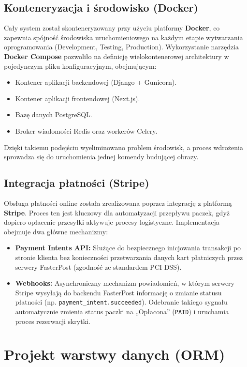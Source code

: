 \subsection{Konteneryzacja i środowisko (Docker)}
Cały system został skonteneryzowany przy użyciu platformy \textbf{Docker}, co zapewnia spójność środowiska uruchomieniowego na każdym etapie wytwarzania oprogramowania (Development, Testing, Production). Wykorzystanie narzędzia \textbf{Docker Compose} pozwoliło na definicję wielokontenerowej architektury w pojedynczym pliku konfiguracyjnym, obejmującym:
\begin{itemize}
    \item Kontener aplikacji backendowej (Django + Gunicorn).
    \item Kontener aplikacji frontendowej (Next.js).
    \item Bazę danych PostgreSQL.
    \item Broker wiadomości Redis oraz workerów Celery.
\end{itemize}
Dzięki takiemu podejściu wyeliminowano problem środowisk, a proces wdrożenia sprowadza się do uruchomienia jednej komendy budującej obrazy.

\subsection{Integracja płatności (Stripe)}
Obsługa płatności online została zrealizowana poprzez integrację z platformą \textbf{Stripe}. Proces ten jest kluczowy dla automatyzacji przepływu paczek, gdyż dopiero opłacenie przesyłki aktywuje procesy logistyczne. Implementacja obejmuje dwa główne mechanizmy:
\begin{itemize}
    \item \textbf{Payment Intents API:} Służące do bezpiecznego inicjowania transakcji po stronie klienta bez konieczności przetwarzania danych kart płatniczych przez serwery FasterPost (zgodność ze standardem PCI DSS).
    \item \textbf{Webhooks:} Asynchroniczny mechanizm powiadomień, w którym serwery Stripe wysyłają do backendu FasterPost informację o zmianie statusu płatności (np. \texttt{payment\_intent.succeeded}). Odebranie takiego sygnału automatycznie zmienia status paczki na „Opłacona” (\texttt{PAID}) i uruchamia proces rezerwacji skrytki.
\end{itemize}

\section{Projekt warstwy danych (ORM)}

